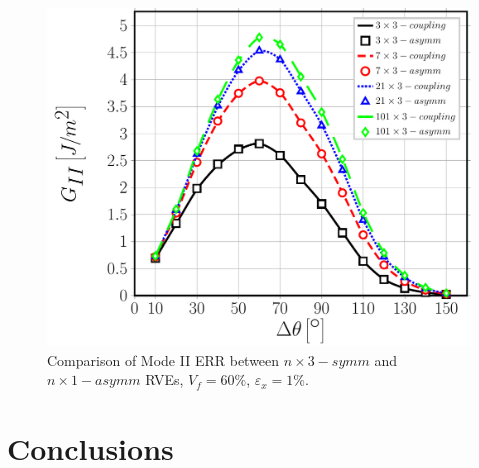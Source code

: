 \begin{figure}[!htb]
\centering
  \includegraphics[width=\textwidth]{paperD/nxk-coupling-vf60-GII.pdf}
\caption{Comparison of Mode II ERR between $n \times 3−symm$ and $n \times 1−asymm$ RVEs, $V_{f}=60\%$, $\varepsilon_{x}=1\%$.}\label{paperD:fig:nxk-GII}
\end{figure}


\section{Conclusions}

